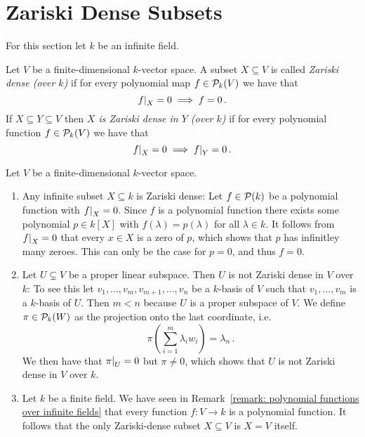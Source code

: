 \section{Zariski Dense Subsets}


\begin{fluff}
  For this section let $k$ be an infinite field.
\end{fluff}


\begin{definition}
  Let $V$ be a finite-dimensional $k$-vector space.
  A subset $X \subseteq V$ is called \emph{Zariski dense \textup(over $k$\textup)} if for every polynomial map $f \in \mathcal{P}_k(V)$ we have that
  \[
              \restrict{f}{X} = 0
    \implies  f = 0 \,.
  \]
  If $X \subseteq Y \subseteq V$ then \emph{$X$ is Zariski dense in $Y$ \textup(over $k$\textup)} if for every polynomial function $f \in \mathcal{P}_k(V)$ we have that
  \[
              \restrict{f}{X} = 0
    \implies  \restrict{f}{Y} = 0 \,.
  \]
\end{definition}


\begin{example}
  Let $V$ be a finite-dimensional $k$-vector space.
  \begin{enumerate}
    \item 
      Any infinite subset $X \subseteq k$ is Zariski dense:
      Let $f \in \mathcal{P}(k)$ be a polynomial function with $\restrict{f}{X} = 0$.
      Since $f$ is a polynomial function there exists some polynomial $p \in k[X]$ with $f(\lambda) = p(\lambda)$ for all $\lambda \in k$.
      It follows from $\restrict{f}{X} = 0$ that every $x \in X$ is a zero of $p$, which shows that $p$ has infinitley many zeroes.
      This can only be the case for $p = 0$, and thus $f = 0$.
    \item
      Let $U \subsetneq V$ be a proper linear subspace.
      Then $U$ is not Zariski dense in $V$ over $k$:
      To see this let $v_1, \dotsc, v_m, v_{m+1}, \dotsc, v_n$ be a $k$-basis of $V$ such that $v_1, \dotsc, v_m$ is a $k$-basis of $U$.
      Then $m < n$ because $U$ is a proper subspace of $V$.
      We define $\pi \in \mathcal{P}_k(W)$ as the projection onto the last coordinate, i.e.
      \[
          \pi\left( \sum_{i=1}^m \lambda_i w_i \right)
        = \lambda_n \,.
      \]
      We then have that $\restrict{\pi}{U} = 0$ but $\pi \neq 0$, which shows that $U$ is not Zariski dense in $V$ over $k$.
    \item
      Let $k$ be a finite field.
      We have seen in Remark~\ref{remark: polynomial functions over infinite fields} that every function $f \colon V \to k$ is a polynomial function.
      It follows that the only Zariski-dense subset $X \subseteq V$ is $X = V$ itself.
  \end{enumerate}
\end{example}


